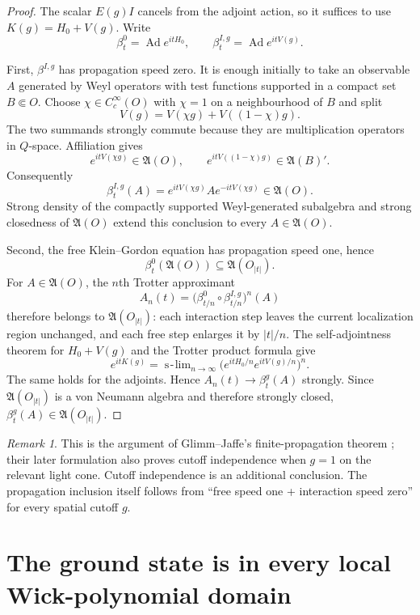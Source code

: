 \documentclass[11pt,a4paper]{article}
\theoremstyle{remark}
\newtheorem{remark}[theorem]{Remark}
\newcommand{\A}{\mathfrak A}
\begin{document}
\begin{proof}
The scalar $E(g)I$ cancels from the adjoint action, so it suffices to use $K(g)=H_0+V(g)$.
Write
\[
 \beta_t^0=\operatorname{Ad}e^{itH_0},\qquad
 \beta_t^{I,g}=\operatorname{Ad}e^{itV(g)}.
\]

First, $\beta^{I,g}$ has propagation speed zero.  It is enough initially to take an observable
$A$ generated by Weyl operators with test functions supported in a compact set $B\Subset O$.
Choose $\chi\in C_c^\infty(O)$ with $\chi=1$ on a neighbourhood of $B$ and split
\[
 V(g)=V(\chi g)+V((1-\chi)g).
\]
The two summands strongly commute because they are multiplication operators in $Q$-space.
Affiliation gives
\[
 e^{itV(\chi g)}\in\A(O),
 \qquad e^{itV((1-\chi)g)}\in\A(B)'.
\]
Consequently
\[
 \beta_t^{I,g}(A)
 =e^{itV(\chi g)}A e^{-itV(\chi g)}\in\A(O).
\]
Strong density of the compactly supported Weyl-generated subalgebra and strong closedness of
$\A(O)$ extend this conclusion to every $A\in\A(O)$.

Second, the free Klein--Gordon equation has propagation speed one, hence
\[
 \beta_t^0(\A(O))\subseteq\A(O_{|t|}).
\]
For $A\in\A(O)$, the $n$th Trotter approximant
\[
 A_n(t)=\bigl(\beta_{t/n}^0\circ\beta_{t/n}^{I,g}\bigr)^n(A)
\]
therefore belongs to $\A(O_{|t|})$: each interaction step leaves the current localization region
unchanged, and each free step enlarges it by $|t|/n$.  The self-adjointness theorem for
$H_0+V(g)$ and the Trotter product formula give
\[
 e^{itK(g)}=\mathop{\mathrm{s\! -\! lim}}_{n\to\infty}
             \bigl(e^{itH_0/n}e^{itV(g)/n}\bigr)^n.
\]
The same holds for the adjoints.  Hence $A_n(t)\to\beta_t^g(A)$ strongly.  Since
$\A(O_{|t|})$ is a von Neumann algebra and therefore strongly closed,
$\beta_t^g(A)\in\A(O_{|t|})$.
\end{proof}

\begin{remark}
This is the argument of Glimm--Jaffe's finite-propagation theorem
\cite[Ch.~4, Prop.~4.1.1 and Thm.~4.1.2]{GJExp}; their later formulation
\cite[Thm.~8.1]{GJModels} also proves cutoff independence when $g=1$ on the relevant light cone.
Cutoff independence is an additional conclusion.  The propagation inclusion itself follows from
``free speed one + interaction speed zero'' for every spatial cutoff $g$.
\end{remark}

\section{The ground state is in every local Wick-polynomial domain}
\end{document}
